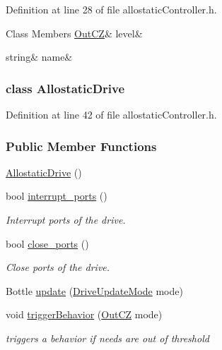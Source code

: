 Definition at line 28 of file allostatic\+Controller.\+h.

\begin{DoxyFields}{Class Members}
\mbox{\label{group__allostaticController_a5f3a5c7c49f34e0d0196ec0c75b7afaf}} 
\hyperlink{group__allostaticController_gaf40887c05ba83b6f4c0809ce4716dcbc}{OutCZ}&
level&
\\
\hline

\mbox{\label{group__allostaticController_a3ac86bf70ff4ec5faea3b5d2666c836a}} 
string&
name&
\\
\hline

\end{DoxyFields}
\label{classAllostaticDrive}
\subsubsection{class Allostatic\+Drive}


Definition at line 42 of file allostatic\+Controller.\+h.

\subsubsection*{Public Member Functions}
\begin{DoxyCompactItemize}
\item 
\hyperlink{group__allostaticController_aaa650f6d22aab98491d3a416a6f779fa}{Allostatic\+Drive} ()
\item 
bool \hyperlink{group__allostaticController_a7344034cd5c68b5a9580e3bc0bd35c6b}{interrupt\+\_\+ports} ()
\begin{DoxyCompactList}\small\item\em Interrupt ports of the drive. \end{DoxyCompactList}\item 
bool \hyperlink{group__allostaticController_a39a9ed70e712c005bb825ffcd1f47c26}{close\+\_\+ports} ()
\begin{DoxyCompactList}\small\item\em Close ports of the drive. \end{DoxyCompactList}\item 
Bottle \hyperlink{group__allostaticController_a2d05d5861a68c6b8126b5d1d6fb97f69}{update} (\hyperlink{group__allostaticController_gab2a3f165075ddd5df4b2f6910928a311}{Drive\+Update\+Mode} mode)
\item 
void \hyperlink{group__allostaticController_a70e9a461682da34e29e77d5d85d5a11c}{trigger\+Behavior} (\hyperlink{group__allostaticController_gaf40887c05ba83b6f4c0809ce4716dcbc}{Out\+CZ} mode)
\begin{DoxyCompactList}\small\item\em triggers a behavior if needs are out of threshold \end{DoxyCompactList}\end{DoxyCompactItemize}
